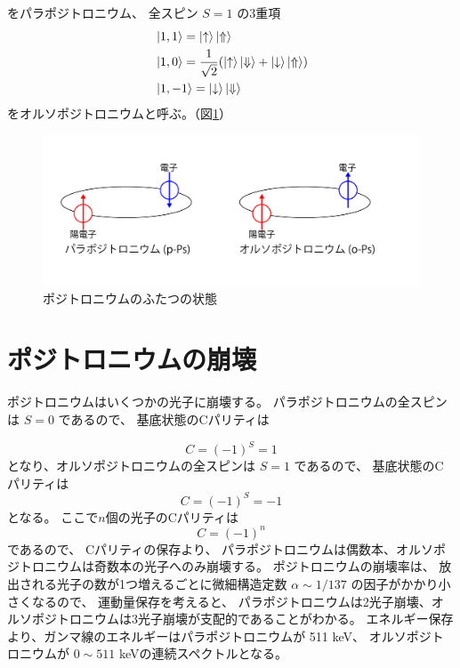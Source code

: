 をパラポジトロニウム、
全スピン $S = 1$ の3重項
\begin{equation}
\begin{split}
&\ket{1,1} = \ket{ \uparrow } \ket{ \Uparrow } \\
&\ket{1,0} = \frac{1}{\sqrt{2}} ( \ket{ \uparrow } \ket{ \Downarrow } + \ket{ \downarrow } \ket{ \Uparrow }) \\
&\ket{1,-1} = \ket{ \downarrow } \ket{ \Downarrow }
\end{split}
\label{eq:ortho}
\end{equation}
をオルソポジトロニウムと呼ぶ。（図\ref{fig:Ps}）

\begin{figure}[H]
\centering
\includegraphics[keepaspectratio, scale=0.4]{fig/ybm/Ps.pdf}
\caption{ポジトロニウムのふたつの状態}
\label{fig:Ps}
\end{figure}


\section{ポジトロニウムの崩壊}

ポジトロニウムはいくつかの光子に崩壊する。
パラポジトロニウムの全スピンは $S=0$ であるので、
基底状態のCパリティは

\begin{equation}
	\nonumber
C = (-1)^{S} = 1
\end{equation}
となり、オルソポジトロニウムの全スピンは $S=1$ であるので、
基底状態のCパリティは
\begin{equation}
	\nonumber
C = (-1)^{S} = -1
\end{equation}
となる。
ここで$n$個の光子のCパリティは
\begin{equation}
	\nonumber
C = (-1)^{n}
\end{equation}
であるので、
Cパリティの保存より、
パラポジトロニウムは偶数本、オルソポジトロニウムは奇数本の光子へのみ崩壊する。
ポジトロニウムの崩壊率は、
放出される光子の数が1つ増えるごとに微細構造定数 $\alpha \sim 1/137$ の因子がかかり小さくなるので、
運動量保存を考えると、
パラポジトロニウムは2光子崩壊、オルソポジトロニウムは3光子崩壊が支配的であることがわかる。
エネルギー保存より、ガンマ線のエネルギーはパラポジトロニウムが 511 keV、
オルソポジトロニウムが $0 \sim 511$  keVの連続スペクトルとなる。

